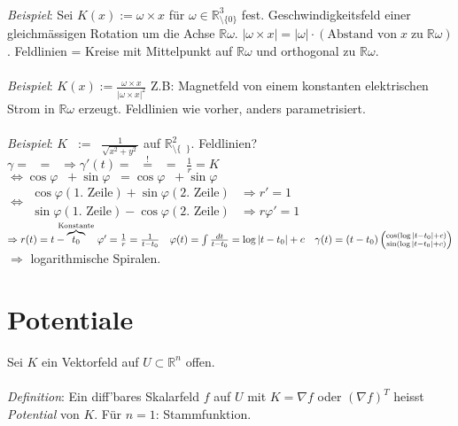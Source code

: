 \documentclass[12pt,a4paper,titlepage]{article}
\newcommand{\setR}{\mathbb{R}}
\newcommand{\twovec}[2]{\mathop{\left(\substack{#1 \\ #2}\right)}}
\begin{document}
\\
\textit{Beispiel}: Sei $K(x):=\omega\times x$ für $\omega\in\setR^3_{\setminus\{0\}}$ fest. Geschwindigkeitsfeld einer gleichmässigen Rotation um die Achse $\setR\omega$. $|\omega\times x|=|\omega|\cdot(\text{Abstand von}\; x \;\text{zu}\; \setR\omega)$. Feldlinien = Kreise mit Mittelpunkt auf $\setR\omega$ und orthogonal zu $\setR\omega$. \\
\\
\textit{Beispiel}: $K(x):=\frac{\omega\times x}{|\omega\times x|^2}$ Z.B: Magnetfeld von einem konstanten elektrischen Strom in $\setR\omega$ erzeugt. Feldlinien wie vorher, anders parametrisiert. \\
\\
\textit{Beispiel}: $K\twovec{x}{y}:=\twovec{x-y}{x+y}\frac{1}{\sqrt{x^2+y^2}}$ auf $\setR^2_{\setminus\{\twovec{0}{0}\}}$. Feldlinien? \\
$\gamma=\twovec{x}{y}=\twovec{r\cos\varphi}{r\sin\varphi} \Rightarrow \gamma'(t)=\twovec{r'\cos\varphi-r\sin\varphi\cdot\varphi'}{r'\sin\varphi+r\cos\varphi\cdot\varphi'} \overset{!}{=} \twovec{\cos\varphi-\sin\varphi}{\cos\varphi+\sin\varphi} = \twovec{r\cos\varphi-r\sin\varphi}{r\cos\varphi+r\sin\varphi}\frac{1}{r} = K$ \\
$\iff \cos\varphi\twovec{r'}{r\varphi'}+\sin\varphi\twovec{-r\varphi'}{r'}=\cos\varphi\twovec{1}{1}+\sin\varphi\twovec{-1}{1}$ \\
$\iff\begin{array}{ll}
  \cos\varphi(\text{1. Zeile})+\sin\varphi(\text{2. Zeile}) & \Rightarrow r'=1 \\
  \sin\varphi(\text{1. Zeile})-\cos\varphi(\text{2. Zeile}) & \Rightarrow r\varphi'=1
\end{array}$ \\
$\Rightarrow r(t)=t-\overbrace{t_0}^{\mathclap{\text{Konstante}}} \quad \varphi'=\frac{1}{r}=\frac{1}{t-t_0} \quad \varphi(t)=\int\frac{dt}{t-t_0} = \log|t-t_0|+c \quad \gamma(t)=(t-t_0)\twovec{\cos(\log|t-t_0|+c)}{\sin(\log|t-t_0|+c)}$ \\
$\Rightarrow$ logarithmische Spiralen.

\section*{Potentiale}
Sei $K$ ein Vektorfeld auf $U\subset\setR^n$ offen. \\
\\
\textit{Definition}: Ein diff'bares Skalarfeld $f$ auf $U$ mit $K=\nabla f$ oder $(\nabla f)^T$ heisst \emph{Potential} von $K$. Für $n=1$: Stammfunktion.
\end{document}
